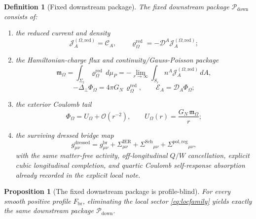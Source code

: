 \documentclass[11pt]{article}
\newcommand{\SpatialD}{\mathcal D}
\newcommand{\LapPerp}{\Delta_\perp}
\newcommand{\FlowPot}{\Phi_\Omega}
\newcommand{\CoulPot}{U_\Omega}
\newcommand{\SourceDensityRed}{\varrho_\Omega^{\mathrm{red}}}
\newcommand{\SourceCurrentRed}{\mathcal J^{(\Omega,\mathrm{red})}}
\newcommand{\ConstCurrent}{\mathcal C}
\newcommand{\SourceFlux}{\mathcal E}
\newcommand{\HamChargeOmega}{\mathfrak m_\Omega}
\newcommand{\SigmaIER}{\Sigma^{\mathrm{IER}}}
\newcommand{\SigmaDressSch}{\Sigma^{\mathrm{Sch}}}
\newcommand{\SigmaRegPol}{\Sigma^{\mathrm{pol,reg}}}
\newcommand{\CurvProfile}{F_{\mathrm{br}}}
\newcommand{\DownPkg}{\mathscr P_{\mathrm{down}}}
\newtheorem{definition}{Definition}
\newtheorem{proposition}{Proposition}
\begin{document}
\begin{definition}[Fixed downstream package]
\label{def:downstream}
The \emph{fixed downstream package} \(\DownPkg\) consists of:
\begin{enumerate}
    \item the reduced current and density
    \begin{equation}
    \SourceCurrentRed_A=\ConstCurrent_A,
    \qquad
    \SourceDensityRed=-\SpatialD^A\SourceCurrentRed_A;
    \label{eq:pkgcurrent}
    \end{equation}
    \item the Hamiltonian-charge flux and continuity/Gauss-Poisson package
    \begin{equation}
    \HamChargeOmega
    =
    \int_{\Sigma_t}\SourceDensityRed\,d\mu_P
    =
    -\lim_{r\to\infty}\int_{S_r} n^A\SourceCurrentRed_A\,dA,
    \label{eq:pkgcharge}
    \end{equation}
    \begin{equation}
    -\LapPerp\FlowPot=4\pi G_N\,\SourceDensityRed,
    \qquad
    \SourceFlux_A=\SpatialD_A\FlowPot;
    \label{eq:pkgpoisson}
    \end{equation}
    \item the exterior Coulomb tail
    \begin{equation}
    \FlowPot
    =
    \CoulPot+\mathcal O(r^{-2}),
    \qquad
    \CoulPot(r)=\frac{G_N\,\HamChargeOmega}{r};
    \label{eq:pkgcoul}
    \end{equation}
    \item the surviving dressed bridge map
    \begin{equation}
    g_{\mu\nu}^{\mathrm{dressed}}
    =
    g_{\mu\nu}^{\mathrm{br}}
    +\SigmaIER_{\mu\nu}
    +\SigmaDressSch{}_{\mu\nu}
    +\SigmaRegPol{}_{\mu\nu},
    \label{eq:pkgmetric}
    \end{equation}
    with the same matter-free activity, off-longitudinal \(Q/W\) cancellation, explicit cubic longitudinal completion, and quartic Coulomb self-response absorption already recorded in the explicit local note.
\end{enumerate}
\end{definition}

\begin{proposition}[The fixed downstream package is profile-blind]
\label{prop:profileblind}
For every smooth positive profile \(\CurvProfile\), eliminating the local sector \eqref{eq:locfamily} yields exactly the same downstream package \(\DownPkg\).
\end{proposition}
\end{document}

